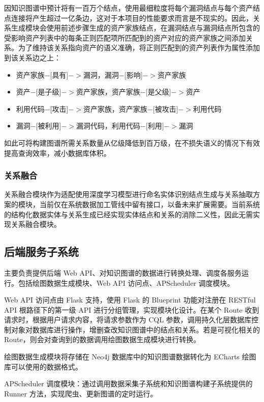 \documentclass[a4paper,AutoFakeBold,oneside,12pt]{book}
\begin{document}
因知识图谱中预计将有一百万个结点，使用最细粒度将每个漏洞结点与每个资产结点连接将产生超过一亿条边，这对于本项目的性能要求而言是不现实的。因此，关系生成模块会使用前述步骤生成的资产家族结点，在漏洞结点与漏洞结点所包含的受影响资产列表中的每条正则匹配项所匹配到的资产对应的资产家族之间添加关系。为了维持该关系指向资产的语义准确，将正则匹配到的资产列表作为属性添加到该关系边之上：
\begin{itemize}
	\item 资产家族$-[$具有$]->$漏洞，漏洞$-[$影响$]->$资产家族
	\item 资产$-[$是子级$]->$资产家族，资产家族$-[$是父级$]->$资产
	\item 利用代码$-[$攻击$]->$资产家族，资产家族$-[$被攻击$]->$利用代码
	\item 漏洞$-[$被利用$]->$漏洞代码，利用代码$-[$利用$]->$漏洞
\end{itemize}

如此可将构建图谱所需关系数量从亿级降低到百万级，在不损失语义的情况下有效提高查询效率，减小数据库体积。

\subsubsection{关系融合}

关系融合模块作为适配使用深度学习模型进行命名实体识别结点生成与关系抽取方案的模块，当前仅在系统数据加工管线中留有接口，以备未来扩展需要。当前系统的结构化数据实体与关系生成已经实现实体结点和关系的消除二义性，因此无需实现关系融合模块。

\subsection{后端服务子系统}

主要负责提供后端 Web API、对知识图谱的数据进行转换处理、调度各服务运行。包括绘图数据生成模块、Web API 访问点、APScheduler 调度模块。

Web API 访问点由 Flask 支持，使用 Flask 的 Blueprint 功能对注册在 RESTful API 根路径下的第一级 API 进行分组管理，实现模块化设计。在某个 Route 收到请求时，根据用户请求内容，将请求参数作为 CQL 参数，调用持久化层数据库控制对象对数据库进行操作，增删查改知识图谱中的结点和关系。若是可视化相关的 Route，则会对查询到的数据调用绘图数据生成模块进行转换。

绘图数据生成模块将存储在 Neo4j 数据库中的知识图谱数据转化为 ECharts 绘图库可以使用的数据格式。

APScheduler 调度模块：通过调用数据采集子系统和知识图谱构建子系统提供的 Runner 方法，实现爬虫、更新图谱的定时运行。
\end{document}
